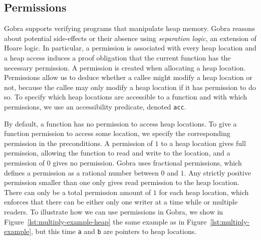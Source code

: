 \subsection{Permissions}
\label{sec:permissions}

Gobra supports verifying programs that manipulate heap memory.
Gobra reasons about potential side-effects or their absence using \emph{separation logic}, an extension of Hoare logic. 
In particular, a permission is associated with every heap location and a heap access induces a proof obligation that the current function has the necessary permission.
A permission is created when allocating a heap location.
Permissions allow us to deduce whether a callee might modify a heap location or not, because the callee may only modify a heap location if it has permission to do so.
To specify which heap locations are accessible to a function and with which permissions, we use an accessibility predicate, denoted \texttt{acc}.


By default, a function has no permission to access heap locations.
To give a function permission to access some location, we specify the corresponding permission in the preconditions.
A permission of $1$ to a heap location gives full permission, allowing the function to read and write to the location, and a permission of $0$ gives no permission.
Gobra uses fractional permissions, which defines a permission as a rational number between $0$ and $1$.
Any strictly positive permission smaller than one only gives read permission to the heap location.
There can only be a total permission amount of $1$ for each heap location, which enforces that there can be either only one writer at a time while or multiple readers.
To illustrate how we can use permissions in Gobra, we show in Figure~\ref{lst:multiply-example-heap} the same example as in Figure~\ref{lst:multiply-example}, but this time \texttt{a} and \texttt{b} are pointers to heap locations.

